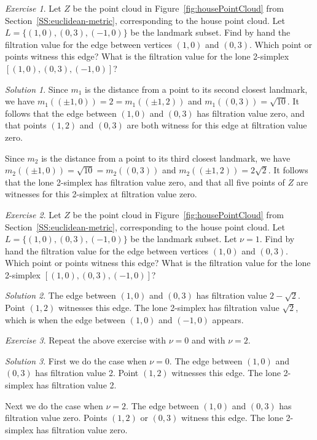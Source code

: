 \documentclass[amscd, amssymb, verbatim]{amsart}[12pt]
\theoremstyle{remark}
\theoremstyle{remark}
\newtheorem{exerciseSol}{Exercise}
\theoremstyle{remark}
\newtheorem*{solution}{Solution}
\begin{document}
\begin{exerciseSol}
Let $Z$ be the point cloud in Figure~\ref{fig:housePointCloud} from Section~\ref{SS:euclidean-metric}, corresponding to the house point cloud. Let $L = \{(1,0),(0,3),(-1,0)\}$ be the landmark subset. Find by hand the filtration value for the edge between vertices $(1,0)$ and $(0,3)$. Which point or points witness this edge? What is the filtration value for the lone 2-simplex $[(1,0),(0,3),(-1,0)]$?
\end{exerciseSol}

\begin{solution}
Since $m_1$ is the distance from a point to its second closest landmark, we have $m_1((\pm1,0))=2=m_1((\pm1,2))$ and $m_1((0,3))=\sqrt{10}$. It follows that the edge between $(1,0)$ and $(0,3)$ has filtration value zero, and that points $(1,2)$ and $(0,3)$ are both witness for this edge at filtration value zero.

Since $m_2$ is the distance from a point to its third closest landmark, we have $m_2((\pm1,0))=\sqrt{10}=m_2((0,3))$ and $m_2((\pm1,2))=2\sqrt{2}$. It follows that the lone 2-simplex has filtration value zero, and that all five points of $Z$ are witnesses for this 2-simplex at filtration value zero.
\end{solution}

\begin{exerciseSol}
Let $Z$ be the point cloud in Figure~\ref{fig:housePointCloud} from Section~\ref{SS:euclidean-metric}, corresponding to the house point cloud. Let $L = \{(1,0),(0,3),(-1,0)\}$ be the landmark subset. Let $\nu = 1$. Find by hand the filtration value for the edge between vertices $(1,0)$ and $(0,3)$. Which point or points witness this edge? What is the filtration value for the lone 2-simplex $[(1,0),(0,3),(-1,0)]$?
\end{exerciseSol}

\begin{solution}
The edge between $(1, 0)$ and $(0, 3)$ has filtration value $2-\sqrt{2}$. Point $(1, 2)$ witnesses this edge. The lone 2-simplex has filtration value $\sqrt{2}$, which is when the edge between $(1, 0)$ and $(-1, 0)$ appears. 
\end{solution}

\begin{exerciseSol}
Repeat the above exercise with $\nu = 0$ and with $\nu = 2$.
\end{exerciseSol}

\begin{solution}
First we do the case when $\nu = 0$. The edge between $(1, 0)$ and $(0, 3)$ has filtration value 2. Point $(1, 2)$ witnesses this edge. The lone 2-simplex has filtration value 2. 

Next we do the case when $\nu = 2$. The edge between $(1, 0)$ and $(0, 3)$ has filtration value zero. Points $(1, 2)$ or $(0, 3)$ witness this edge. The lone 2-simplex has filtration value zero. 
\end{solution}
\end{document}
